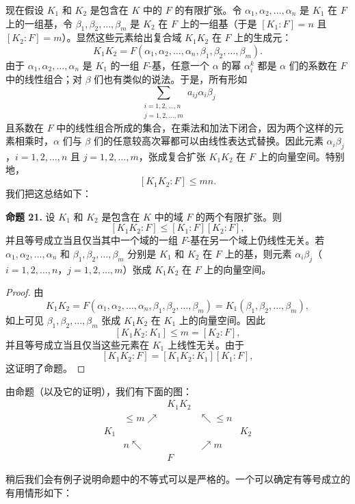现在假设 $K_1$ 和 $K_2$ 是包含在 $K$ 中的 $F$ 的有限扩张。令 $\alpha_1,\alpha_2,\ldots,\alpha_n$ 是 $K_1$ 在 $F$ 上的一组基，令 $\beta_1,\beta_2,\ldots,\beta_m$ 是 $K_2$ 在 $F$ 上的一组基（于是 $[K_1:F]=n$ 且 $[K_2:F]=m$）。显然这些元素给出复合域 $K_1K_2$ 在 $F$ 上的生成元：
\[
K_1K_2=F(\alpha_1,\alpha_2,\ldots,\alpha_n,
\beta_1,\beta_2,\ldots,\beta_m).
\]
由于 $\alpha_1,\alpha_2,\ldots,\alpha_n$ 是 $K_1$ 的一组 $F$-基，任意一个 $\alpha$ 的幂 $\alpha_i^k$ 都是 $\alpha$ 们的系数在 $F$ 中的线性组合；对 $\beta$ 们也有类似的说法。于是，所有形如
\[
\sum_{\substack{i=1,2,\ldots,n\\ j=1,2,\ldots,m}} a_{ij}\alpha_i\beta_j
\]
且系数在 $F$ 中的线性组合所成的集合，在乘法和加法下闭合，因为两个这样的元素相乘时，$\alpha$ 们与 $\beta$ 们的任意较高次幂都可以由线性表达式替换。因此元素 $\alpha_i\beta_j$，$i=1,2,\ldots,n$ 且 $j=1,2,\ldots,m$，张成复合扩张 $K_1K_2$ 在 $F$ 上的向量空间。特别地，
\[
[K_1K_2:F]
\leq mn.
\]
我们把这总结如下：

\noindent\textbf{命题 21.} 设 $K_1$ 和 $K_2$ 是包含在 $K$ 中的域 $F$ 的两个有限扩张。则
\[
[K_1K_2:F]
\leq [K_1:F][K_2:F],
\]
并且等号成立当且仅当其中一个域的一组 $F$-基在另一个域上仍线性无关。若 $\alpha_1,\alpha_2,\ldots,\alpha_n$ 和 $\beta_1,\beta_2,\ldots,\beta_m$ 分别是 $K_1$ 和 $K_2$ 在 $F$ 上的基，则元素 $\alpha_i\beta_j$（$i=1,2,\ldots,n$，$j=1,2,\ldots,m$）张成 $K_1K_2$ 在 $F$ 上的向量空间。

\begin{proof}
	由
	\[
	K_1K_2=F(\alpha_1,\alpha_2,\ldots,\alpha_n,
	\beta_1,\beta_2,\ldots,\beta_m)=K_1(\beta_1,\beta_2,\ldots,\beta_m),
	\]
	如上可见 $\beta_1,\beta_2,\ldots,\beta_m$ 张成 $K_1K_2$ 在 $K_1$ 上的向量空间。因此
	\[
	[K_1K_2:K_1]\leq m=[K_2:F],
	\]
	并且等号成立当且仅当这些元素在 $K_1$ 上线性无关。由于
	\[
	[K_1K_2:F]=[K_1K_2:K_1][K_1:F],
	\]
	这证明了命题。
\end{proof}

由命题（以及它的证明），我们有下面的图：
\[
\begin{array}{ccccc}
	& & K_1K_2 & & \\
	& {\scriptstyle \leq m}\nearrow & & \nwarrow{\scriptstyle \leq n} & \\
	K_1 & & & & K_2\\
	& {\scriptstyle n}\nwarrow & & \nearrow{\scriptstyle m} & \\
	& & F & &
\end{array}
\]

稍后我们会有例子说明命题中的不等式可以是严格的。一个可以确定有等号成立的有用情形如下：

